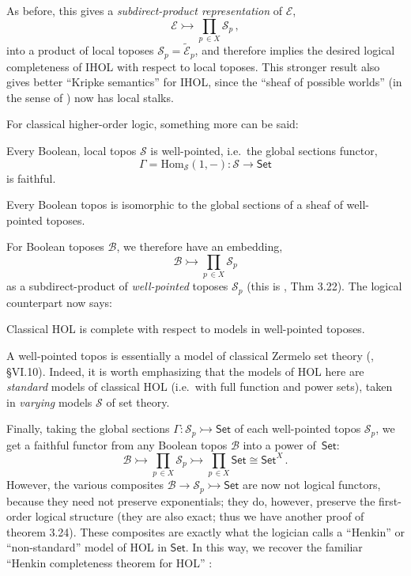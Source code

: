 \documentclass[graybox]{svmult}
\newcommand{\EE}{\ensuremath{\mathcal{E}}}
\newcommand{\Set}{\ensuremath{\mathsf{Set}}}
\renewcommand{\hom}{\ensuremath{\mathrm{Hom}}}
\begin{document}
As before, this gives a \emph{subdirect-product representation} of $\EE$,
\[
\EE \rightarrowtail \prod_{p\,\in X}\mathcal{S}_p\,,
\]
into a product of local toposes $\mathcal{S}_p = \widetilde{\EE}_p$, and therefore implies the desired logical completeness of IHOL with respect to local toposes.  
This stronger result also gives better ``Kripke semantics'' for IHOL, since the ``sheaf of possible worlds'' (in the sense of \cite{L1}) now has local stalks.
\medskip

For classical higher-order logic, something more can be said:

\begin{lemma}
Every Boolean, local topos $\mathcal{S}$ is well-pointed, i.e.\ the global sections functor,
\[
\Gamma = \hom_\mathcal{S}(1, - ) : \mathcal{S} \to \Set
\]
is faithful.
\end{lemma}

\begin{corollary}
Every Boolean topos is isomorphic to the global sections of a sheaf of well-pointed toposes.  
\end{corollary}
%
For Boolean toposes $\mathcal{B}$, we therefore have an embedding, 
\[
\mathcal{B} \rightarrowtail \prod_{p\,\in X}\mathcal{S}_p 
\]
as a subdirect-product of \emph{well-pointed} toposes $\mathcal{S}_p$ (this is \cite{F}, Thm 3.22).  The logical counterpart now says:
%
\begin{corollary}
Classical HOL is complete with respect to models in well-pointed toposes.
\end{corollary}
%
A well-pointed topos is essentially a model of classical Zermelo set theory (\cite{MM}, {\S}VI.10).  Indeed, it is worth emphasizing that the models of HOL here are \emph{standard} models of classical HOL (i.e.\ with full function and power sets), taken in \emph{varying} models $\mathcal{S}$ of set theory.

Finally, taking the global sections $\Gamma:\mathcal{S}_p \rightarrowtail \Set$ of each well-pointed topos $\mathcal{S}_p$, we get a faithful functor from any Boolean topos $\mathcal{B}$ into a power of~$\Set$:
\[
\mathcal{B} \rightarrowtail \prod_{p\,\in X}\mathcal{S}_p \rightarrowtail \prod_{p\,\in X}\Set \cong \Set^X\,.
\]
However, the various composites $\mathcal{B} \rightarrow \mathcal{S}_p \rightarrowtail \Set$ are now not logical functors, because they need not preserve exponentials; they do, however, preserve the first-order logical structure (they are also exact; thus we have another proof of \cite{F} theorem 3.24).  These composites are exactly what the logician calls a ``Henkin'' or ``non-standard'' model of HOL in $\Set$.  In this way, we recover the familiar ``Henkin completeness theorem for HOL'' \cite{H}:
\end{document}
